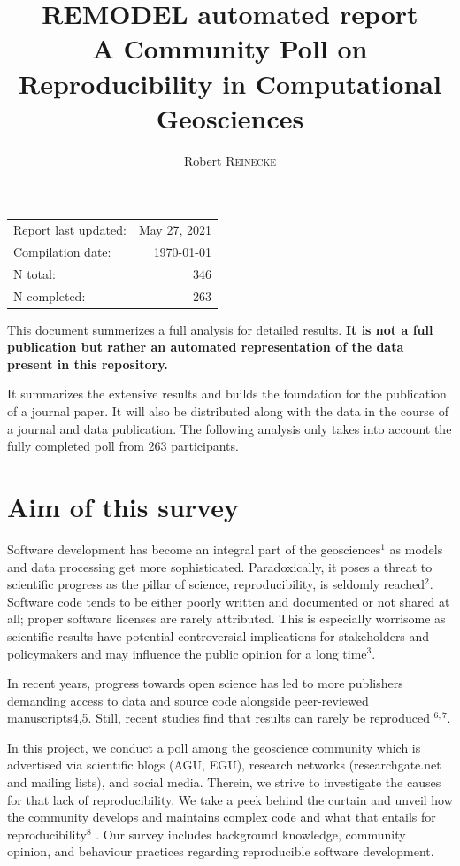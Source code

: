 \documentclass{article}
\title{\textbf{REMODEL automated report} \\ A Community Poll on Reproducibility in Computational Geosciences} %
\author{Robert \textsc{Reinecke}} %
\begin{document}
\maketitle %

\begin{center}
\begin{tabular}{l r}
Report last updated: & May 27, 2021\\
Compilation date: & \today \\
N total: & 346 \\
N completed: & 263\\
\end{tabular}
\end{center}

This document summerizes a full analysis for detailed results. \textbf{It is not a full publication but rather an automated representation of the data present in this repository.}

It summarizes the extensive results and builds the foundation for the publication of a journal paper.
It will also be distributed along with the data in the course of a journal and data publication.
The following analysis only takes into account the fully completed poll from 263 participants.

\thispagestyle{empty}

\tableofcontents
\listoffigures

\newpage

\section{Aim of this survey}
Software development has become an integral part of the geosciences$^{1}$ as models and data processing get more sophisticated.
Paradoxically, it poses a threat to scientific progress as the pillar of science, reproducibility, is seldomly reached$^{2}$.
Software code tends to be either poorly written and documented or not shared at all; proper software licenses are rarely attributed.
This is especially worrisome as scientific results have potential controversial implications for stakeholders and policymakers and may influence the public opinion for a long time$^{3}$.

In recent years, progress towards open science has led to more publishers demanding access to data and source code alongside peer-reviewed manuscripts4,5. Still, recent studies find that results can rarely be reproduced $^{6,7}$.

In this project, we conduct a poll among the geoscience community which is advertised via scientific blogs (AGU, EGU), research networks (researchgate.net and mailing lists), and social media.
Therein, we strive to investigate the causes for that lack of reproducibility.
We take a peek behind the curtain and unveil how the community develops and maintains complex code and what that entails for reproducibility$^{8}$ .
Our survey includes background knowledge, community opinion, and behaviour practices regarding reproducible software development.
\end{document}
